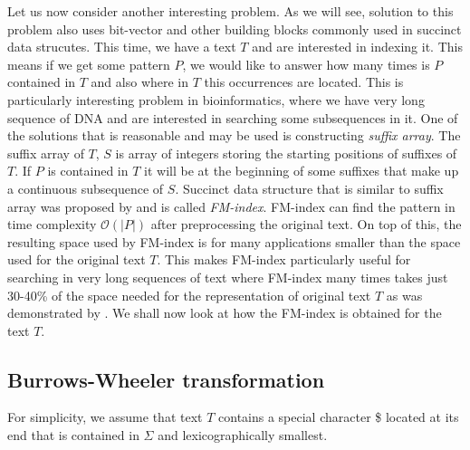 Let us now consider another interesting problem. As we will see, solution to this problem
also uses bit-vector and other building blocks commonly used in succinct data strucutes.
This time, we have a text $T$ and are interested in indexing it. This means if we get some
pattern $P$, we would like to answer how many times is $P$ contained in $T$ and also where
in $T$ this occurrences are located. This is particularly interesting problem in bioinformatics,
where we have very long sequence of DNA and are interested in searching some subsequences
in it. One of the solutions that is reasonable and may be used is constructing
\textit{suffix array}. The suffix array of $T$, $S$ is array of integers storing
the starting positions of suffixes of $T$. If $P$ is contained in $T$ it will be at the
beginning of some suffixes that make up a continuous subsequence of $S$. Succinct data
structure that is similar to suffix array was proposed by \cite{ferragina2000opportunistic}
and is called \textit{FM-index}. FM-index can find the pattern in time complexity
$\mathcal{O}(|P|)$ after preprocessing the original text. On top of this, the resulting
space used by FM-index is for many applications smaller than the space used for the
original text $T$. This makes FM-index particularly useful for searching in very long sequences
of text where FM-index many times takes just 30-40\% of the space needed for the representation
of original text $T$ as was demonstrated by \cite{ferragina2001experimental}. We shall
now look at how the FM-index is obtained for the text $T$.

\subsection{Burrows-Wheeler transformation}

For simplicity, we assume that text $T$ contains a special character \$ located at its end
that is contained in $\Sigma$ and lexicographically smallest.

